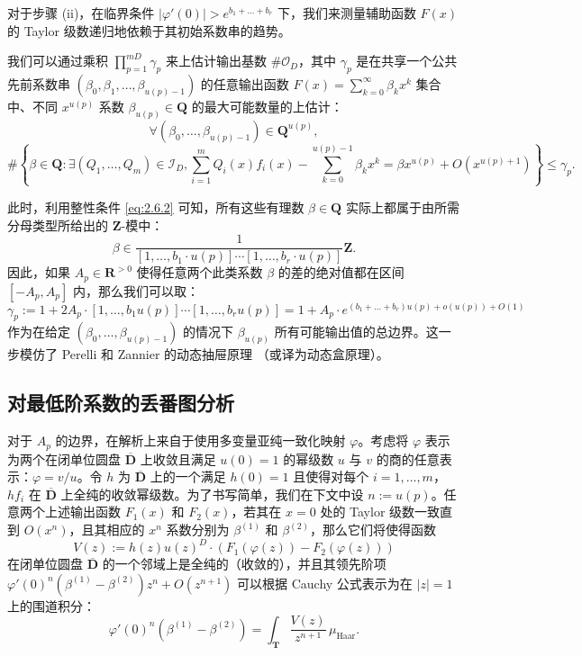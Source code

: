 对于步骤 (ii)，在临界条件 \(|\varphi'(0)| > e^{b_1 + \dots + b_r}\) 下，我们来测量辅助函数 \(F(x)\) 的 Taylor 级数递归地依赖于其初始系数串的趋势。

我们可以通过乘积 \(\prod_{p=1}^{mD} \gamma_p\) 来上估计输出基数 \(\#\mathcal{O}_D\)，其中 \(\gamma_p\) 是在共享一个公共先前系数串 \((\beta_0, \beta_1, \ldots, \beta_{u(p)-1})\) 的任意输出函数 \(F(x) = \sum_{k=0}^{\infty} \beta_k x^k\) 集合中、不同 \(x^{u(p)}\) 系数 \(\beta_{u(p)} \in \mathbf{Q}\) 的最大可能数量的上估计：
\[ \forall (\beta_0, \dots, \beta_{u(p)-1}) \in \mathbf{Q}^{u(p)}, \]
\[ \# \left\{ \beta \in \mathbf{Q} : \exists (Q_1, \dots, Q_m) \in \mathcal{I}_D, \sum_{i=1}^m Q_i(x) f_i(x) - \sum_{k=0}^{u(p)-1} \beta_k x^k = \beta x^{u(p)} + O(x^{u(p)+1}) \right\} \leq \gamma_p. \]

此时，利用整性条件 \eqref{eq:2.6.2} 可知，所有这些有理数 \(\beta \in \mathbf{Q}\) 实际上都属于由所需分母类型所给出的 \(\mathbf{Z}\)-模中：
\[ \beta \in \frac{1}{[1,\ldots,b_1 \cdot u(p)]\cdots[1,\ldots,b_r \cdot u(p)]}\mathbf{Z}. \]
因此，如果 \(A_p \in \mathbf{R}^{>0}\) 使得任意两个此类系数 \(\beta\) 的差的绝对值都在区间 \([-A_p, A_p]\) 内，那么我们可以取：
\begin{equation}\label{eq:B.2.1}
\gamma_p := 1 + 2A_p \cdot [1, \dots, b_1 u(p)] \cdots [1, \dots, b_r u(p)] = 1 + A_p \cdot e^{(b_1 + \dots + b_r)u(p) + o(u(p)) + O(1)}
\end{equation}
作为在给定 \((\beta_0, \dots, \beta_{u(p)-1})\) 的情况下 \(\beta_{u(p)}\) 所有可能输出值的总边界。这一步模仿了 Perelli 和 Zannier 的动态抽屉原理 \cite[第 2 节引理 1]{PZ84}（或译为动态盒原理）。

\subsection{对最低阶系数的丢番图分析}\label{sec:B.3}

对于 \(A_p\) 的边界，在解析上来自于使用多变量亚纯一致化映射 \(\varphi\)。考虑将 \(\varphi\) 表示为两个在闭单位圆盘 \(\overline{\mathbf{D}}\) 上收敛且满足 \(u(0) = 1\) 的幂级数 \(u\) 与 \(v\) 的商的任意表示：\(\varphi = v/u\)。令 \(h\) 为 \(\overline{\mathbf{D}}\) 上的一个满足 \(h(0) = 1\) 且使得对每个 \(i = 1, \ldots, m\)，\(hf_i\) 在 \(\overline{\mathbf{D}}\) 上全纯的收敛幂级数。为了书写简单，我们在下文中设 \(n := u(p)\)。任意两个上述输出函数 \(F_1(x)\) 和 \(F_2(x)\)，若其在 \(x = 0\) 处的 Taylor 级数一致直到 \(O(x^n)\)，且其相应的 \(x^n\) 系数分别为 \(\beta^{(1)}\) 和 \(\beta^{(2)}\)，那么它们将使得函数
\[ V(z) := h(z)u(z)^D \cdot (F_1(\varphi(z)) - F_2(\varphi(z))) \]
在闭单位圆盘 \(\overline{\mathbf{D}}\) 的一个邻域上是全纯的（收敛的），并且其领先阶项 \(\varphi'(0)^n(\beta^{(1)}-\beta^{(2)})z^n+O(z^{n+1})\) 可以根据 Cauchy 公式表示为在 \(|z|=1\) 上的围道积分：
\begin{equation}\label{eq:B.3.1}
\varphi'(0)^n(\beta^{(1)} - \beta^{(2)}) = \int_{\mathbf{T}} \frac{V(z)}{z^{n+1}} \,\mu_{\text{Haar}}.
\end{equation}

